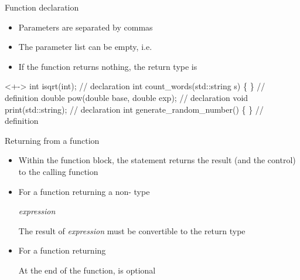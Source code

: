 \begin{frame}[fragile]{Function declaration \insertcontinuationtext}

  \begin{itemize}[<+->]
  \item Parameters are separated by commas

  \item The parameter list can be empty, i.e. \code{()}

  \item If the function returns nothing, the return type is 

  \end{itemize}

  \begin{codeblock}<+->{
int isqrt(int);                        // declaration
int count_words(std::string s) \{ \ddd \}  // definition
double pow(double base, double exp);   // declaration
void print(std::string);               // declaration
int generate_random_number() \{ \ddd \}    // definition}\end{codeblock}

\end{frame}

\begin{frame}[fragile]{Returning from a function}

  \begin{itemize}[<+->]
  \item Within the function block, the \alert{} statement returns
    the result (and the control) to the calling function

  \item For a function returning a non- type

     \textit{expression} \code{;}

    The result of \textit{expression} must be convertible to the return type

  \item For a function returning 


    At the end of the function,  is optional

  \end{itemize}

\end{frame}

